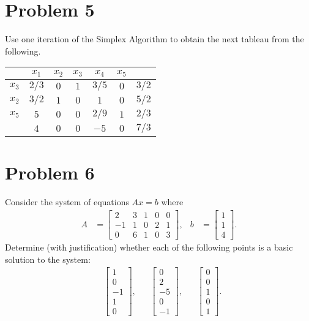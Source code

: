 \documentclass[a4paper, 12pt]{article}
\numberwithin{equation}{section}
\numberwithin{figure}{section}
\theoremstyle{definition}
\begin{document}
\section*{Problem 5}

Use one iteration of the Simplex Algorithm to obtain the next tableau from the following.
\begin{center}
    \begin{tabular}{|c|ccccc|c|}
        \hline 
        & $x_1$ & $x_2$ & $x_3$ & $x_4$ & $x_5$ & \\ \hline
        $x_3$ & $2/3$ & $0$ & $1$ & $3/5$ & $0$ & $3/2$ \\ 
        $x_2$ & $3/2$ & $1$ & $0$ & $1$ & $0$ & $5/2$ \\ 
        $x_5$ & $5$ & $0$ & $0$ & $2/9$ & $1$ & $2/3$ \\ \hline
        & $4$ & $0$ & $0$ & $-5$ & $0$ & $7/3$ \\ \hline
    \end{tabular}
\end{center}

\section*{Problem 6}

Consider the system of equations $Ax=b$ where
\begin{align*}
    A &= \begin{bmatrix}
        2 & 3 & 1 & 0 & 0 \\ 
        -1 & 1 & 0 & 2 & 1 \\
        0 & 6 & 1 & 0 & 3
    \end{bmatrix}, & b &= \begin{bmatrix}
        1 \\ 1 \\ 4
    \end{bmatrix}.
\end{align*}
Determine (with justification) whether each of the following points is a basic solution to the system:
\begin{align*}
    & \begin{bmatrix}
        1 \\ 0 \\ -1 \\ 1 \\ 0 
    \end{bmatrix}, & & \begin{bmatrix}
        0 \\ 2 \\ -5 \\ 0 \\ -1 
    \end{bmatrix}, & & \begin{bmatrix}
        0 \\ 0 \\ 1 \\ 0 \\ 1
    \end{bmatrix}.
\end{align*}
\end{document}
